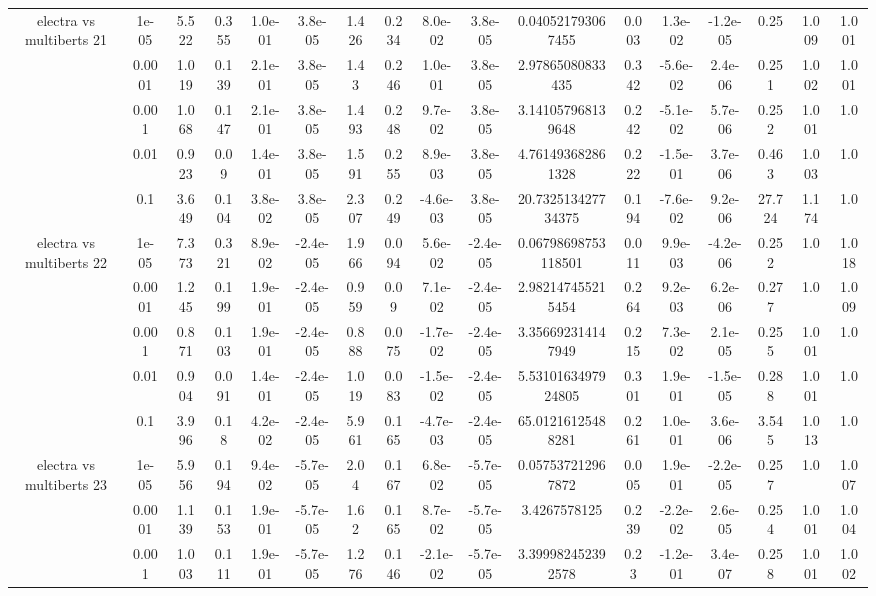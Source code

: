 \begin{tabular}{|c|c|c|c|c|c|c|c|c|c|c|c|c|c|c|c|c|}
\hline
\multirow{5}{*}{electra  vs multiberts 21} & 1e-05 & 5.522 & 0.355 & 1.0e-01 & 3.8e-05 & 1.426 & 0.234 & 8.0e-02 & 3.8e-05 & 0.040521793067455 & 0.003 & 1.3e-02 & -1.2e-05 & 0.25 & 1.009 & 1.001 \\
 & 0.0001 & 1.019 & 0.139 & 2.1e-01 & 3.8e-05 & 1.43 & 0.246 & 1.0e-01 & 3.8e-05 & 2.97865080833435 & 0.342 & -5.6e-02 & 2.4e-06 & 0.251 & 1.002 & 1.001 \\
 & 0.001 & 1.068 & 0.147 & 2.1e-01 & 3.8e-05 & 1.493 & 0.248 & 9.7e-02 & 3.8e-05 & 3.141057968139648 & 0.242 & -5.1e-02 & 5.7e-06 & 0.252 & 1.001 & 1.0 \\
 & 0.01 & 0.923 & 0.09 & 1.4e-01 & 3.8e-05 & 1.591 & 0.255 & 8.9e-03 & 3.8e-05 & 4.761493682861328 & 0.222 & -1.5e-01 & 3.7e-06 & 0.463 & 1.003 & 1.0 \\
 & 0.1 & 3.649 & 0.104 & 3.8e-02 & 3.8e-05 & 2.307 & 0.249 & -4.6e-03 & 3.8e-05 & 20.732513427734375 & 0.194 & -7.6e-02 & 9.2e-06 & 27.724 & 1.174 & 1.0 \\
\hline
\multirow{5}{*}{electra  vs multiberts 22} & 1e-05 & 7.373 & 0.321 & 8.9e-02 & -2.4e-05 & 1.966 & 0.094 & 5.6e-02 & -2.4e-05 & 0.06798698753118501 & 0.011 & 9.9e-03 & -4.2e-06 & 0.252 & 1.0 & 1.018 \\
 & 0.0001 & 1.245 & 0.199 & 1.9e-01 & -2.4e-05 & 0.959 & 0.09 & 7.1e-02 & -2.4e-05 & 2.982147455215454 & 0.264 & 9.2e-03 & 6.2e-06 & 0.277 & 1.0 & 1.009 \\
 & 0.001 & 0.871 & 0.103 & 1.9e-01 & -2.4e-05 & 0.888 & 0.075 & -1.7e-02 & -2.4e-05 & 3.356692314147949 & 0.215 & 7.3e-02 & 2.1e-05 & 0.255 & 1.001 & 1.0 \\
 & 0.01 & 0.904 & 0.091 & 1.4e-01 & -2.4e-05 & 1.019 & 0.083 & -1.5e-02 & -2.4e-05 & 5.5310163497924805 & 0.301 & 1.9e-01 & -1.5e-05 & 0.288 & 1.001 & 1.0 \\
 & 0.1 & 3.996 & 0.18 & 4.2e-02 & -2.4e-05 & 5.961 & 0.165 & -4.7e-03 & -2.4e-05 & 65.01216125488281 & 0.261 & 1.0e-01 & 3.6e-06 & 3.545 & 1.013 & 1.0 \\
\hline
\multirow{5}{*}{electra  vs multiberts 23} & 1e-05 & 5.956 & 0.194 & 9.4e-02 & -5.7e-05 & 2.04 & 0.167 & 6.8e-02 & -5.7e-05 & 0.057537212967872 & 0.005 & 1.9e-01 & -2.2e-05 & 0.257 & 1.0 & 1.007 \\
 & 0.0001 & 1.139 & 0.153 & 1.9e-01 & -5.7e-05 & 1.62 & 0.165 & 8.7e-02 & -5.7e-05 & 3.4267578125 & 0.239 & -2.2e-02 & 2.6e-05 & 0.254 & 1.001 & 1.004 \\
 & 0.001 & 1.003 & 0.111 & 1.9e-01 & -5.7e-05 & 1.276 & 0.146 & -2.1e-02 & -5.7e-05 & 3.399982452392578 & 0.23 & -1.2e-01 & 3.4e-07 & 0.258 & 1.001 & 1.002 \\

\end{tabular}
